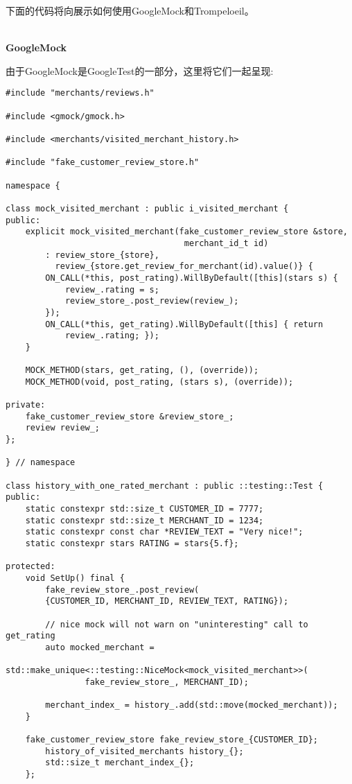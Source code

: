 下面的代码将向展示如何使用GoogleMock和Trompeloeil。

\hspace*{\fill} \\ %
\noindent
\textbf{GoogleMock}

由于GoogleMock是GoogleTest的一部分，这里将它们一起呈现:

\begin{lstlisting}[style=styleCXX]
#include "merchants/reviews.h"

#include <gmock/gmock.h>

#include <merchants/visited_merchant_history.h>

#include "fake_customer_review_store.h"

namespace {
	
class mock_visited_merchant : public i_visited_merchant {
public:
	explicit mock_visited_merchant(fake_customer_review_store &store,
									merchant_id_t id)
		: review_store_{store},
		  review_{store.get_review_for_merchant(id).value()} {
		ON_CALL(*this, post_rating).WillByDefault([this](stars s) {
			review_.rating = s;
			review_store_.post_review(review_);
		});
		ON_CALL(*this, get_rating).WillByDefault([this] { return
			review_.rating; });
	}

	MOCK_METHOD(stars, get_rating, (), (override));
	MOCK_METHOD(void, post_rating, (stars s), (override));

private:
	fake_customer_review_store &review_store_;
	review review_;
};

} // namespace

class history_with_one_rated_merchant : public ::testing::Test {
public:
	static constexpr std::size_t CUSTOMER_ID = 7777;
	static constexpr std::size_t MERCHANT_ID = 1234;
	static constexpr const char *REVIEW_TEXT = "Very nice!";
	static constexpr stars RATING = stars{5.f};
	
protected:
	void SetUp() final {
		fake_review_store_.post_review(
		{CUSTOMER_ID, MERCHANT_ID, REVIEW_TEXT, RATING});
		
		// nice mock will not warn on "uninteresting" call to get_rating
		auto mocked_merchant =
			std::make_unique<::testing::NiceMock<mock_visited_merchant>>(
				fake_review_store_, MERCHANT_ID);
				
		merchant_index_ = history_.add(std::move(mocked_merchant));
	}

	fake_customer_review_store fake_review_store_{CUSTOMER_ID};
		history_of_visited_merchants history_{};
		std::size_t merchant_index_{};
	};


\end{lstlisting}
